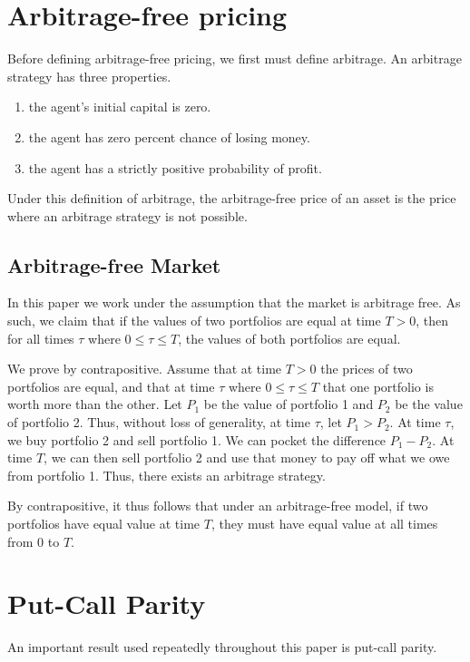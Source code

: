 \documentclass[reqno]{amsart}
\begin{document}
\section{Arbitrage-free pricing}

Before defining arbitrage-free pricing, we first must define arbitrage. An arbitrage strategy has three properties. 
\begin{enumerate}
     \item the agent's initial capital is zero.
     \item the agent has zero percent chance of losing money.
     \item the agent has a strictly positive probability of profit. 
\end{enumerate}
Under this definition of arbitrage, the arbitrage-free price of an asset is the price where an arbitrage strategy is not possible.

\subsection{Arbitrage-free Market}

In this paper we work under the assumption that the market is arbitrage free. As such, we claim that if the values of two portfolios are equal at time $T > 0$, then for all times $\tau$ where $0 \leq \tau \leq T$, the values of both portfolios are equal.

We prove by contrapositive. Assume that at time $T > 0$ the prices of two portfolios are equal, and that at time $\tau$ where $0 \leq \tau \leq T$ that one portfolio is worth more than the other. 
Let $P_1$ be the value of portfolio 1 and $P_2$ be the value of portfolio 2. Thus, without loss of generality, at time $\tau$, let $P_1 > P_2$.
At time $\tau$, we buy portfolio 2 and sell portfolio 1. We can pocket the difference $P_1 - P_2$. At time $T$, we can then sell portfolio 2 and use that money to pay off what we owe from portfolio 1. 
Thus, there exists an arbitrage strategy.

By contrapositive, it thus follows that under an arbitrage-free model, if two portfolios have equal value at time $T$, they must have equal value at all times from $0$ to $T$.

\section{Put-Call Parity}

An important result used repeatedly throughout this paper is put-call parity. 
\end{document}
